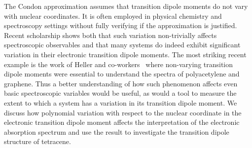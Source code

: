The Condon approximation assumes that transition dipole moments do not vary with nuclear coordinates. It is often employed in physical chemistry and spectroscopy settings without fully verifying if the approximation is justified.   Recent scholarship shows both that such variation non-trivially affects spectroscopic observables and that many systems do indeed exhibit significant variation in their electronic transition dipole moments.  The most striking recent example is the work of Heller and co-workers~\cite{hellerGraphene} where non-varying transition dipole moments were essential to understand the spectra of polyacetylene and graphene.  Thus a better understanding of how such phenomenon affects even basic spectroscopic variables would be useful, as would a tool to measure the extent to which a system has a variation in its transition dipole moment.  We discuss how polynomial variation with respect to the nuclear coordinate in the electronic transition dipole moment affects the interpretation of the electronic absorption spectrum and use the result to investigate the transition dipole structure of tetracene.
